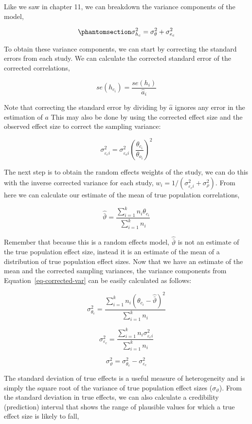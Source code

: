 \documentclass[
  letterpaper,
  DIV=11,
  numbers=noendperiod]{scrreprt}
\begin{document}
Like we saw in chapter 11, we can breakdown the variance components of
the model,

\begin{equation}\phantomsection\label{eq-corrected-var}{
\sigma^2_{h_c} = \sigma^2_{\theta} + \sigma^2_{e_c}
}\end{equation}

To obtain these variance components, we can start by correcting the
standard errors from each study. We can calculate the corrected standard
error of the corrected correlations,

\[
se(h_{c_i}) = \frac{se(h_{i})}{\hat{a}_i}
\]

Note that correcting the standard error by dividing by \(\hat{a}\)
ignores any error in the estimation of \(a\) This may also be done by
using the corrected effect size and the observed effect size to correct
the sampling variance:

\[
\sigma^2_{\varepsilon_ci} = \sigma^2_{\varepsilon_oi} \left(\frac{\theta_{c_i}}{\theta_{o_i}}\right)^2
\]

The next step is to obtain the random effects weights of the study, we
can do this with the inverse corrected variance for each study,
\(w_i=1/(\sigma^2_{\varepsilon_ci}+\sigma^2_\rho)\). From here we can
calculate our estimate of the mean of true population correlations,

\[
\hat{\bar{\vartheta}}=\frac{\sum^k_{i=1}n_i\theta_{c_i}}{\sum^k_{i=1}n_i}
\]

Remember that because this is a random effects model,
\(\hat{\bar{\vartheta}}\) is not an estimate of the true population
effect size, instead it is an estimate of the mean of a distribution of
true population effect sizes. Now that we have an estimate of the mean
and the corrected sampling variances, the variance components from
Equation~\ref{eq-corrected-var} can be easily calculated as follows:

\[
\sigma^2_{\theta_c} = \frac{\sum^k_{i=1}n_i(\theta_{c_i} - \hat{\bar{\vartheta}})^2}{\sum^k_{i=1}n_i}
\]

\[
\sigma^2_{\varepsilon_c} = \frac{\sum^k_{i=1}n_i\sigma^2_{\varepsilon_c i}}{\sum^k_{i=1}n_i}
\]

\[
\sigma^2_{\vartheta}  = \sigma^2_{\theta_c} - \sigma^2_{\varepsilon_c}
\]

The standard deviation of true effects is a useful measure of
heterogeneity and is simply the square root of the variance of true
population effect sizes (\(\sigma_{\vartheta}\)). From the standard
deviation in true effects, we can also calculate a credibility
(prediction) interval that shows the range of plausible values for which
a true effect size is likely to fall,
\end{document}
